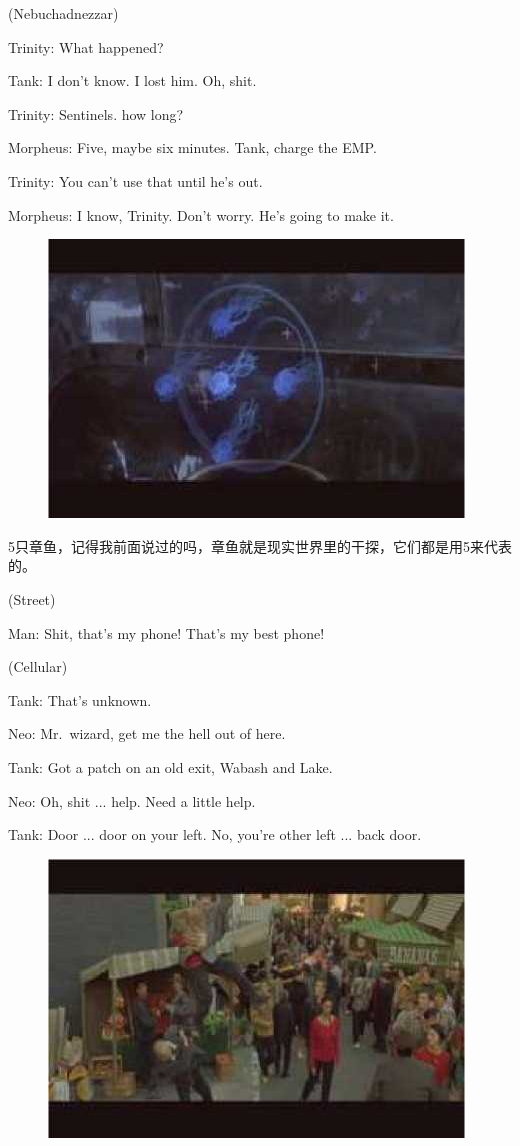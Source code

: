 \documentclass[UTF8]{ctexart}
\newenvironment{myquote}{\color{green} \setlength{\leftskip}{6em} \setlength{\rightskip}{4em} \setlength{\parindent}{-2em}}{\par}
\begin{document}
\begin{myquote}
(Nebuchadnezzar)

Trinity: What happened?

Tank: I don't know. I lost him. Oh, shit.

Trinity: Sentinels. how long?

Morpheus: Five, maybe six minutes. Tank, charge the EMP.

Trinity: You can't use that until he's out.

Morpheus: I know, Trinity. Don't worry. He's going to make it.
\end{myquote}

\begin{figure}[htb]
\centering
\includegraphics[width=0.5\linewidth]{fig/read_Matrix-77}
\end{figure}

5只章鱼，记得我前面说过的吗，章鱼就是现实世界里的干探，它们都是用5来代表的。

\begin{myquote}
(Street)

Man: Shit, that's my phone! That's my best phone!

(Cellular)

Tank: That's unknown.

Neo: Mr.~wizard, get me the hell out of here.

Tank: Got a patch on an old exit, Wabash and Lake.

Neo: Oh, shit ... help. Need a little help.

Tank: Door ... door on your left. No, you're other left ... back door.
\end{myquote}

\begin{figure}[htb]
\centering
\includegraphics[width=0.5\linewidth]{fig/read_Matrix-78}
\end{figure}
\end{document}
